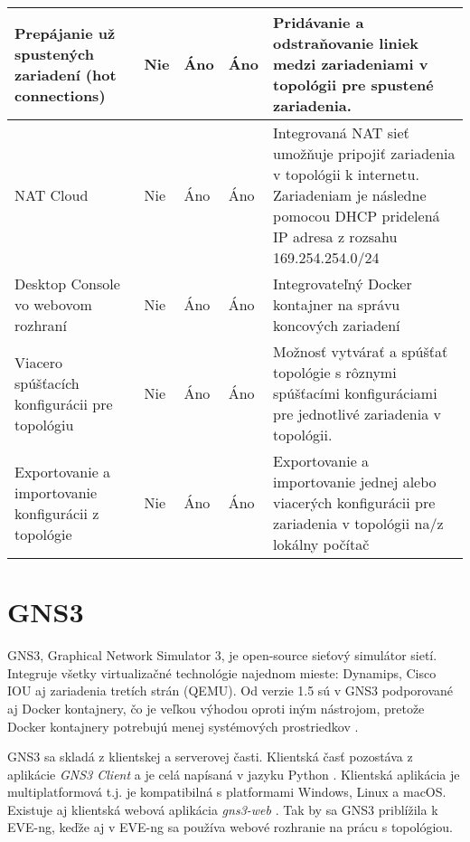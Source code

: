 \begin{longtable}{| m{3cm} | m{2cm} | m{2cm} | m{2cm} | m{4cm} |}
Prepájanie už spustených zariadení (hot connections) & Nie                & Áno             & Áno                  & Pridávanie a odstraňovanie liniek medzi zariadeniami v topológii pre spustené zariadenia.                           \\ \hline
NAT Cloud                                             & Nie                & Áno             & Áno                  & Integrovaná NAT sieť umožňuje pripojiť zariadenia v topológii k internetu. Zariadeniam je následne pomocou DHCP pridelená IP adresa z rozsahu 169.254.254.0/24 \\ \hline
Desktop Console vo webovom rozhraní                                  & Nie                & Áno             & Áno                  & Integrovateľný Docker kontajner na správu koncových zariadení                          \\ \hline
Viacero spúšťacích konfigurácii pre topológiu            & Nie                & Áno             & Áno                  & Možnosť vytvárať a spúšťať topológie s rôznymi spúšťacími konfiguráciami pre jednotlivé zariadenia v topológii.                     \\ \hline
Exportovanie a importovanie konfigurácii z topológie     & Nie                & Áno             & Áno                  & Exportovanie a importovanie jednej alebo viacerých konfigurácii pre zariadenia v topológii na/z lokálny počítač                                             \\ \hline  
\end{longtable}





\section{GNS3}

GNS3, Graphical Network Simulator 3, je open-source sieťový simulátor sietí. Integruje všetky virtualizačné technológie najednom mieste: Dynamips, Cisco IOU aj zariadenia tretích strán (QEMU). Od verzie 1.5 sú v GNS3 podporované aj Docker kontajnery, čo je veľkou výhodou oproti iným nástrojom, pretože Docker kontajnery potrebujú menej systémových prostriedkov \cite{gns3_docker}.

GNS3 sa skladá z klientskej a serverovej časti. Klientská časť pozostáva z aplikácie \emph{GNS3 Client} a je celá napísaná v jazyku Python \cite{gns3_gui_github}. Klientská aplikácia je multiplatformová t.j. je kompatibilná s platformami Windows, Linux a macOS. Existuje aj klientská webová aplikácia \emph{gns3-web} \cite{gns3_web_github}. Tak by sa GNS3 priblížila k EVE-ng, keďže aj v EVE-ng sa používa webové rozhranie na prácu s topológiou.

